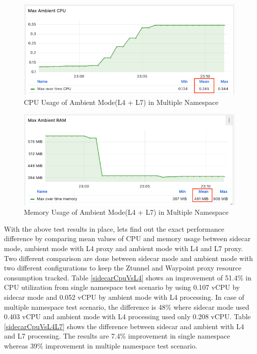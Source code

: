 \begin{figure}[H]
  \centering
  \includegraphics[width=0.85\linewidth]{resources/ambient-multi-ns-l4-l7-cpu.png}
  \caption{CPU Usage of Ambient Mode(L4 + L7) in Multiple Namespace}
\end{figure}

\begin{figure}[H]
  \centering
  \includegraphics[width=0.85\linewidth]{resources/ambient-multi-ns-l4-l7-mem.png}
  \caption{Memory Usage of Ambient Mode(L4 + L7) in Multiple Namespace}
\end{figure}

With the above test results in place, lets find out the exact performance difference by comparing mean values of CPU and memory usage between sidecar mode, ambient mode with L4 proxy and ambient mode with L4 and L7 proxy. Two different comparison are done between sidecar mode and ambient mode with two different configurations to keep the Ztunnel and Waypoint proxy resource consumption tracked. Table \ref{sidecarCpuVsL4} shows an improvement of 51.4\% in CPU utilization from single namespace test scenario by using 0.107 vCPU by sidecar mode and 0.052 vCPU by ambient mode with L4 processing. In case of multiple namespace test scenario, the difference is 48\% where sidecar mode used 0.403 vCPU and ambient mode with L4 processing used only 0.208 vCPU. Table \ref{sidecarCpuVsL4L7} shows the difference between sidecar and ambient with L4 and L7 processing. The results are 7.4\% improvement in single namespace whereas 39\% improvement in multiple namespace test scenario.

